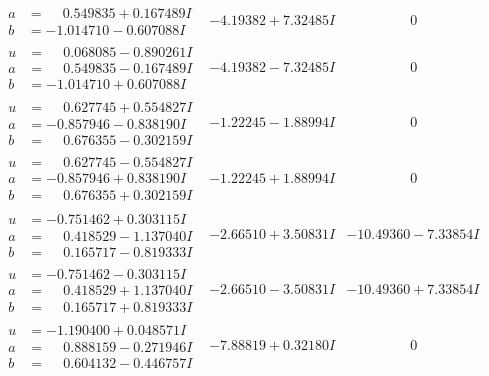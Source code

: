 \documentclass[1p]{elsarticle_modified}
\theoremstyle{definition}
\begin{document}
$$\begin{array}{c|c|c}
\begin{aligned}
a &= \phantom{-}0.549835 + 0.167489 I \\
b &= -1.014710 - 0.607088 I\end{aligned}
 & -4.19382 + 7.32485 I & \phantom{-0.000000 } 0 \\ \hline\begin{aligned}
u &= \phantom{-}0.068085 - 0.890261 I \\
a &= \phantom{-}0.549835 - 0.167489 I \\
b &= -1.014710 + 0.607088 I\end{aligned}
 & -4.19382 - 7.32485 I & \phantom{-0.000000 } 0 \\ \hline\begin{aligned}
u &= \phantom{-}0.627745 + 0.554827 I \\
a &= -0.857946 - 0.838190 I \\
b &= \phantom{-}0.676355 - 0.302159 I\end{aligned}
 & -1.22245 - 1.88994 I & \phantom{-0.000000 } 0 \\ \hline\begin{aligned}
u &= \phantom{-}0.627745 - 0.554827 I \\
a &= -0.857946 + 0.838190 I \\
b &= \phantom{-}0.676355 + 0.302159 I\end{aligned}
 & -1.22245 + 1.88994 I & \phantom{-0.000000 } 0 \\ \hline\begin{aligned}
u &= -0.751462 + 0.303115 I \\
a &= \phantom{-}0.418529 - 1.137040 I \\
b &= \phantom{-}0.165717 - 0.819333 I\end{aligned}
 & -2.66510 + 3.50831 I & -10.49360 - 7.33854 I \\ \hline\begin{aligned}
u &= -0.751462 - 0.303115 I \\
a &= \phantom{-}0.418529 + 1.137040 I \\
b &= \phantom{-}0.165717 + 0.819333 I\end{aligned}
 & -2.66510 - 3.50831 I & -10.49360 + 7.33854 I \\ \hline\begin{aligned}
u &= -1.190400 + 0.048571 I \\
a &= \phantom{-}0.888159 - 0.271946 I \\
b &= \phantom{-}0.604132 - 0.446757 I\end{aligned}
 & -7.88819 + 0.32180 I & \phantom{-0.000000 } 0 \\ \hline\begin{aligned}

\end{aligned}
\end{array}$$
\end{document}
